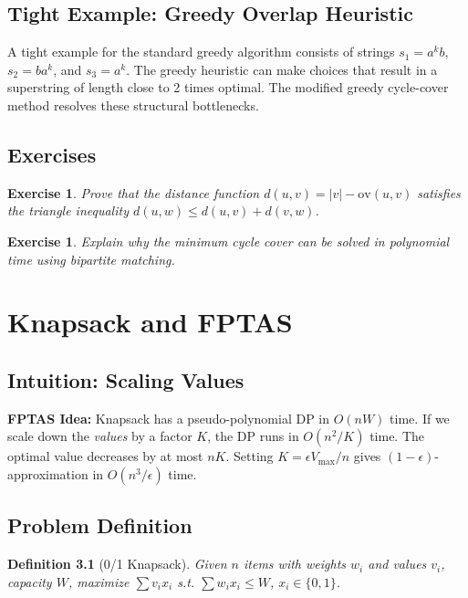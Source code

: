 \documentclass[11pt,oneside]{book}
\newtheorem{definition}[theorem]{Definition}
\newtheorem{exercise}[theorem]{Exercise}
\begin{document}
\section{Tight Example: Greedy Overlap Heuristic}
A tight example for the standard greedy algorithm consists of strings $s_1 = a^k b$, $s_2 = b a^k$, and $s_3 = a^k$. The greedy heuristic can make choices that result in a superstring of length close to 2 times optimal. The modified greedy cycle-cover method resolves these structural bottlenecks.

\section{Exercises}
\begin{exercise}
Prove that the distance function $d(u, v) = |v| - \text{ov}(u, v)$ satisfies the triangle inequality $d(u, w) \le d(u, v) + d(v, w)$.
\end{exercise}
\begin{exercise}
Explain why the minimum cycle cover can be solved in polynomial time using bipartite matching.
\end{exercise}

\chapter{Knapsack and FPTAS}
\label{ch:knapsack}

\section{Intuition: Scaling Values}

\begin{intuitionbox}
\textbf{FPTAS Idea:} Knapsack has a pseudo-polynomial DP in $O(nW)$ time. If we scale down the \emph{values} by a factor $K$, the DP runs in $O(n^2/K)$ time. The optimal value decreases by at most $nK$. Setting $K = \epsilon V_{\max}/n$ gives $(1-\epsilon)$-approximation in $O(n^3/\epsilon)$ time.
\end{intuitionbox}

\section{Problem Definition}

\begin{definition}[0/1 Knapsack]
Given $n$ items with weights $w_i$ and values $v_i$, capacity $W$, maximize $\sum v_i x_i$ s.t. $\sum w_i x_i \leq W$, $x_i \in \{0,1\}$.
\end{definition}
\end{document}
